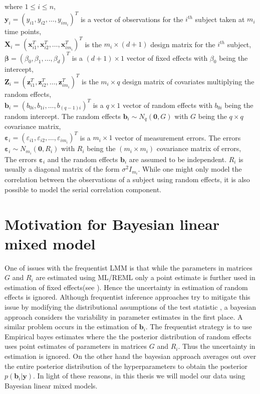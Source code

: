 where $1 \le i \le n$,\\
$\boldsymbol{y}_i = {(y_{i1}, y_{i2}, \ldots, y_{im_i})}^T$ is a vector of observations for the $i^{th}$ subject taken at $m_i$ time points,\\
$\boldsymbol{X}_i = {(\boldsymbol{x}_{i1}^T, \boldsymbol{x}_{i2}^T, \ldots, \boldsymbol{x}_{im_i}^T)}^T$ is the $m_i \times (d+1)$ design matrix for the $i^{th}$ subject,\\
$\boldsymbol{\beta} = {(\beta_0, \beta_1, \ldots, \beta_d)}^T$ is a $(d+1) \times 1$ vector of fixed effects with $\beta_0$ being the intercept,\\
$\boldsymbol{Z}_i = {(\boldsymbol{z}_{i1}^T, \boldsymbol{z}_{i2}^T, \ldots, \boldsymbol{z}_{im_i}^T)}^T$ is the $m_i \times q$ design matrix of covariates multiplying the random effects,\\
$\boldsymbol{b}_i = {(b_{0i}, b_{1i}, \ldots, b_{(q-1)i})}^T$ is a $q \times 1$ vector of random effects with $b_{0i}$ being the random intercept. The random effects $\boldsymbol{b}_i \sim N_q(\boldsymbol{0}, G)$ with $G$ being the $q \times q$ covariance matrix,\\ 
$\boldsymbol{\varepsilon}_{i} = {(\varepsilon_{i1}, \varepsilon_{i2}, \ldots, \varepsilon_{im_i})}^T$ is a $m_i \times 1$ vector of measurement errors. The errors $\boldsymbol{\varepsilon}_{i} \sim N_{m_i}(\boldsymbol{0}, R_i)$ with $R_i$ being the $(m_i \times m_i)$ covariance matrix of errors,\\

The errors $\boldsymbol{\varepsilon}_{i}$ and the random effects $\boldsymbol{b}_i$ are assumed to be independent. $R_i$ is usually a diagonal matrix of the form $\sigma^2I_{m_i}$. While one might only model the correlation between the observations of a subject using random effects, it is also possible to model the serial correlation component.

\section{Motivation for Bayesian linear mixed model}
\label{sec : blmm}
One of issues with the frequentist LMM is that while the parameters in matrices $G$ and $R_i$ are estimated using ML/REML only a point estimate is further used in estimation of fixed effects(see \cite[chap. 5]{verbeke_linear_2009}). Hence the uncertainty in estimation of random effects is ignored. Although frequentist inference approaches try to mitigate this issue by modifying the distributional assumptions of the test statistic \citep[pg. 56]{verbeke_linear_2009}, a bayesian approach considers the variability in parameter estimates in the first place. A similar problem occurs in the estimation of $\boldsymbol{b}_i$. The frequentist strategy is to use Empirical bayes estimates where the the posterior distribution of random effects uses point estimates of parameters in matrices $G$ and $R_i$. Thus the uncertainty in estimation is ignored. On the other hand the bayesian approach averages out over the entire posterior distribution of the hyperparameters to obtain the posterior $p(\boldsymbol{b}_i|\boldsymbol{y})$. In light of these reasons, in this thesis we will model our data using Bayesian linear mixed models.\\

